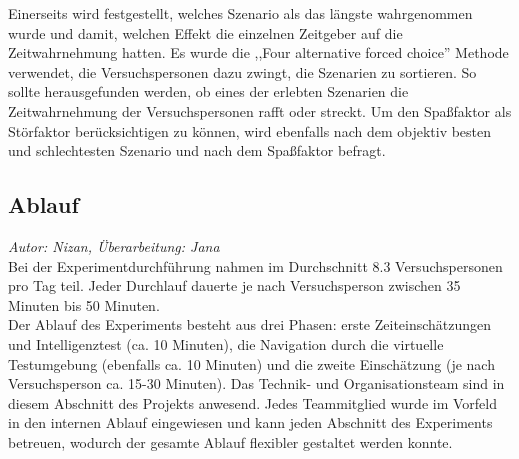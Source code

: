 \documentclass{Bericht}
\begin{document}
Einerseits wird festgestellt, welches Szenario als das längste wahrgenommen wurde und damit, welchen Effekt die einzelnen Zeitgeber auf die Zeitwahrnehmung hatten. 
Es wurde die ,,Four alternative forced choice'' Methode verwendet, die Versuchspersonen dazu zwingt, die Szenarien zu sortieren. So sollte herausgefunden werden, ob eines der erlebten Szenarien die Zeitwahrnehmung der Versuchspersonen rafft oder streckt.	
Um den Spaßfaktor als Störfaktor berücksichtigen zu können, wird ebenfalls nach dem objektiv besten und schlechtesten Szenario und nach dem Spaßfaktor befragt.

\subsection{Ablauf}
\textit{Autor: Nizan, Überarbeitung: Jana}\\
Bei der Experimentdurchführung nahmen im Durchschnitt 8.3 Versuchspersonen pro Tag teil. Jeder Durchlauf dauerte je nach Versuchsperson zwischen 35 Minuten bis 50 Minuten.\\
Der Ablauf des Experiments besteht aus drei Phasen: erste Zeiteinschätzungen und Intelligenztest (ca. 10 Minuten), die Navigation durch die virtuelle Testumgebung (ebenfalls ca. 10 Minuten) und die zweite Einschätzung (je nach Versuchsperson ca. 15-30 Minuten). Das Technik- und Organisationsteam sind in diesem Abschnitt des Projekts anwesend. Jedes Teammitglied wurde im Vorfeld in den internen Ablauf eingewiesen und kann jeden Abschnitt des Experiments betreuen, wodurch der gesamte Ablauf flexibler gestaltet werden konnte.\\ 
\end{document}
